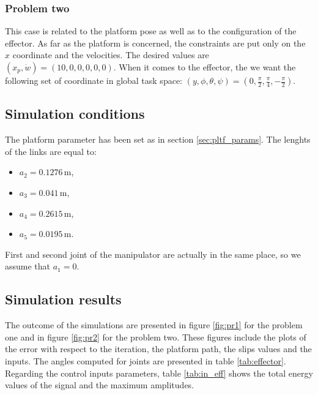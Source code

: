 \subsubsection{Problem two}
This case is related to the platform pose as well as to the configuration of the effector.
As far as the platform is concerned, the constraints are put only on the $x$ coordinate and
the velocities. The desired values are $(x_p, \dot{w}) = (10, 0, 0, 0, 0, 0)$. When it comes to
the effector, the we want the following set of coordinate in global task space: $(y, \phi, \theta, \psi)
= (0, \frac{\pi}{2}, \frac{\pi}{4}, -\frac{\pi}{2})$.

\subsection{Simulation conditions}
The platform parameter has been set as in section \ref{sec:pltf_params}. The lenghts of the links
are equal to:
\begin{multicols}{2}
\begin{itemize}
\item $a_2=0.1276 \,\mathrm{m}$,
\item $a_3=0.041 \,\mathrm{m}$,
\item $a_4=0.2615 \,\mathrm{m}$,
\item $a_5=0.0195 \,\mathrm{m}$.
\end{itemize}
\end{multicols}
First and second joint of the manipulator are actually in the same place, so we assume that $a_1=0$.

\subsection{Simulation results}
The outcome of the simulations are presented in figure \ref{fig:pr1} for the problem one and in figure
\ref{fig:pr2} for the problem two. These figures include the plots of the error with respect to the
iteration, the platform path, the slips values and the inputs. The angles computed for joints are
presented in table \ref{tab:effector}. Regarding the control inputs parameters, table \ref{tab:in_eff}
shows the total energy values of the signal and the maximum amplitudes.

